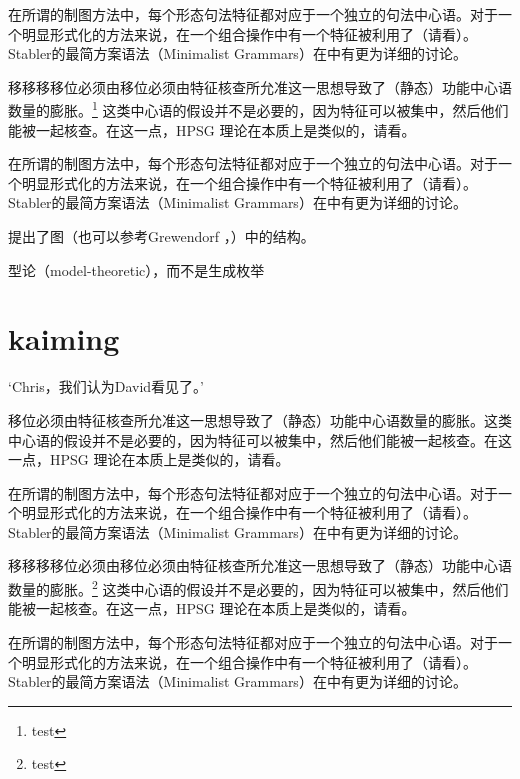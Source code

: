 \documentclass{scrbook}
\let\citew\citealp
\newcommand{\page}{}
\begin{document}
在所谓的制图方法中，每个形态句法特征都对应于一个独立的句法中心语\citep[\page 54, 61]{CR2010a}。对于一个明显形式化的方法来说，在一个组合操作中有一个特征被利用了（请看\citew[\page 335]{Stabler2001a}）。Stabler的最简方案语法（Minimalist Grammars）在中有更为详细的讨论。

移移移移位必须由移位必须由特征核查所允准这一思想导致了（静态）功能中心语数量的膨胀。\footnote{test} 这类中心语的假设并不是必要的，因为特征可以被集中，然后他们能被一起核查。在这一点，HPSG 理论在本质上是类似的，请看\citew[\S~II.3.3.4, \S~II.4.2]{Sternefeld2006a-u}。

在所谓的制图方法中，每个形态句法特征都对应于一个独立的句法中心语\citep[\page 54, 61]{CR2010a}。对于一个明显形式化的方法来说，在一个组合操作中有一个特征被利用了（请看\citew[\page 335]{Stabler2001a}）。Stabler的最简方案语法（Minimalist Grammars）在中有更为详细的讨论。

\citet[\page 297]{Rizzi97a-u}提出了图（也可以参考Grewendorf \citeyear[\page 85, 240]{Grewendorf2002a}，\citeyear{Grewendorf2009a}）中的结构。

型论（model-theoretic），而不是生成枚举

\section{kaiming}

    `Chris，我们认为David看见了。'

移位必须由特征核查所允准这一思想导致了（静态）功能中心语数量的膨胀。这类中心语的假设并不是必要的，因为特征可以被集中，然后他们能被一起核查。在这一点，HPSG 理论在本质上是类似的，请看\citew[\S~II.3.3.4, \S~II.4.2]{Sternefeld2006a-u}。

在所谓的制图方法中，每个形态句法特征都对应于一个独立的句法中心语\citep[\page 54, 61]{CR2010a}。对于一个明显形式化的方法来说，在一个组合操作中有一个特征被利用了（请看\citew[\page 335]{Stabler2001a}）。Stabler的最简方案语法（Minimalist Grammars）在中有更为详细的讨论。

移移移移位必须由移位必须由特征核查所允准这一思想导致了（静态）功能中心语数量的膨胀。\footnote{test} 这类中心语的假设并不是必要的，因为特征可以被集中，然后他们能被一起核查。在这一点，HPSG 理论在本质上是类似的，请看\citew[\S~II.3.3.4, \S~II.4.2]{Sternefeld2006a-u}。

在所谓的制图方法中，每个形态句法特征都对应于一个独立的句法中心语\citep[\page 54, 61]{CR2010a}。对于一个明显形式化的方法来说，在一个组合操作中有一个特征被利用了（请看\citew[\page 335]{Stabler2001a}）。Stabler的最简方案语法（Minimalist Grammars）在中有更为详细的讨论。
\end{document}
